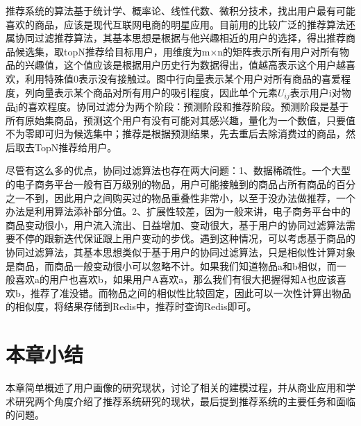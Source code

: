 		推荐系统的算法基于统计学、概率论、线性代数、微积分技术，找出用户最有可能喜欢的商品，应该是现代互联网电商的明星应用。目前用的比较广泛的推荐算法还属协同过滤推荐算法，其基本思想是根据与他兴趣相近的用户的选择，得出推荐商品候选集，取topN推荐给目标用户，用维度为m×n的矩阵表示所有用户对所有物品的兴趣值，这个值应该是根据用户历史行为数据得出，值越高表示这个用户越喜欢，利用特殊值0表示没有接触过。图中行向量表示某个用户对所有商品的喜爱程度，列向量表示某个商品对所有用户的吸引程度，因此单个元素$U_{ij}$表示用户i对物品j的喜欢程度。协同过滤分为两个阶段：预测阶段和推荐阶段。预测阶段是基于所有原始集商品，预测这个用户有没有可能对其感兴趣，量化为一个数值，只要值不为零即可归为候选集中；推荐是根据预测结果，先去重后去除消费过的商品，然后取去TopN推荐给用户。

		尽管有这么多的优点，协同过滤算法也存在两大问题：1、数据稀疏性。一个大型的电子商务平台一般有百万级别的物品，用户可能接触到的商品占所有商品的百分之一不到，因此用户之间购买过的物品重叠性非常小，以至于没办法做推荐，一个办法是利用算法添补部分值\citep{recmd-slopone}。2、扩展性较差，因为一般来讲，电子商务平台中的商品变动很小，用户流入流出、日益增加、变动很大，基于用户的协同过滤算法需要不停的跟新迭代保证跟上用户变动的步伐。遇到这种情况，可以考虑基于商品的协同过滤算法，其基本思想类似于基于用户的协同过滤算法，只是相似性计算对象是商品，而商品一般变动很小可以忽略不计。如果我们知道物品a和b相似，而一般喜欢a的用户也喜欢b，如果用户A喜欢a，那么我们有很大把握得知A也应该喜欢b，推荐了准没错。而物品之间的相似性比较固定，因此可以一次性计算出物品的相似度，将结果存储到Redis中，推荐时查询Redis即可。

	\section{本章小结}
	本章简单概述了用户画像的研究现状，讨论了相关的建模过程，并从商业应用和学术研究两个角度介绍了推荐系统研究的现状，最后提到推荐系统的主要任务和面临的问题。